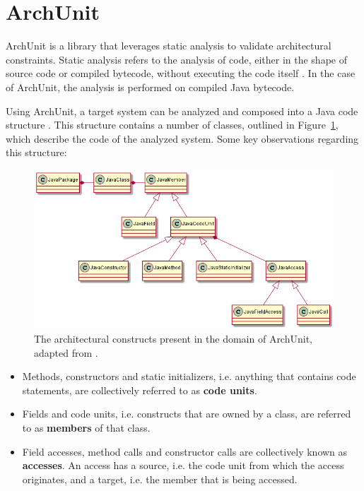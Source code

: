 \section{ArchUnit}\label{archunit-back-section}
ArchUnit is a library that leverages static analysis to validate architectural constraints. Static analysis refers to the analysis of code, either in the shape of source code or compiled bytecode, without executing the code itself \cite[p. 21]{chess_secure_2007}. In the case of ArchUnit, the analysis is performed on compiled Java bytecode.

Using ArchUnit, a target system can be analyzed and composed into a Java code structure \cite{gafert_archunit_2020}. This structure contains a number of classes, outlined in Figure~\ref{fig:archunit}, which describe the code of the analyzed system. Some key observations regarding this structure:

\begin{figure}
    \centering
    \captionsetup{justification=centering}
    \includegraphics[width=\textwidth]{figure/ArchUnit.png}
    \caption{The architectural constructs present in the domain of ArchUnit, adapted from \cite{gafert_archunit_2020}.}
    \label{fig:archunit}
\end{figure}

\begin{itemize}
    \item Methods, constructors and static initializers, i.e. anything that contains code statements, are collectively referred to as \textbf{code units}.
    \item Fields and code units, i.e. constructs that are owned by a class, are referred to as \textbf{members} of that class.
    \item Field accesses, method calls and constructor calls are collectively known as \textbf{accesses}. An access has a source, i.e. the code unit from which the access originates, and a target, i.e. the member that is being accessed.
\end{itemize}

